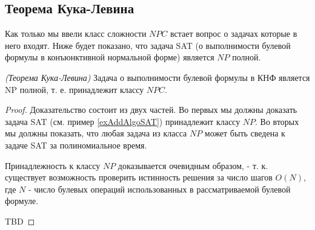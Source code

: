 \subsection{Теорема Кука-Левина}

Как только мы ввели класс сложности $NPC$ встает вопрос о задачах
которые в него входят. Ниже будет показано, что задача SAT (о
выполнимости булевой формулы в конъюнктивной нормальной форме)
является $NP$ полной.  

\begin{theorem}
\emph{(Теорема Кука-Левина)}
Задача о выполнимости булевой формулы в КНФ является NP полной,
т. е. принадлежит классу $NPC$.
\label{theoremAddAlgoCookTheorem}
\end{theorem}

\begin{proof}
  Доказательство состоит из двух частей. Во первых мы должны доказать
  задача SAT (см. пример \ref{exAddAlgoSAT}) принадлежит классу
  $NP$. Во вторых мы должны показать, что любая задача из класса $NP$
  может быть сведена к задаче SAT за полиномиальное время.
  
  Принадлежность к классу $NP$ доказывается очевидным образом, -
  т. к. существует возможность проверить истинность решения за число
  шагов $O\left(N\right)$, где $N$ - число булевых операций
  использованных в рассматриваемой булевой формуле.

 
  TBD
\end{proof}

